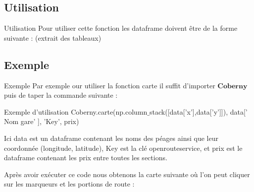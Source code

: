 \documentclass{beamer}
\begin{document}
\subsection{Utilisation}
\begin{frame}[fragile]{Utilisation}
Pour utiliser cette fonction les dataframe doivent être de la forme suivante : (extrait des tableaux) \newline
{}
\end{frame}

\subsection{Exemple}
\begin{frame}[fragile]{Exemple}
Par exemple our utiliser la fonction carte il suffit d'importer $\textbf{Coberny}$ puis de taper la commande suivante :
\begin{block}{Exemple d'utilisation}
Coberny.carte(np.column$\_$stack([data['x'],data['y']]), data[' Nom gare' ], 'Key', prix)
\end{block}
\pause

Ici data est un dataframe contenant les noms des péages ainsi que leur coordonnée (longitude, latitude), Key est la clé openrouteservice, et prix est le dataframe contenant les prix entre toutes les sections. \newline
\pause

Après avoir exécuter ce code nous obtenons la carte suivante où l'on peut cliquer sur les marqueurs et les portions de route :
\end{frame}
\end{document}
